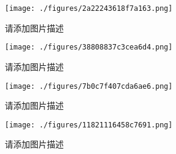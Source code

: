 
\begin{issues}
\issueDraft
\end{issues}

\begin{figure}[ht]
\centering
\texttt{[image: ./figures/2a22243618f7a163.png]}
\caption{请添加图片描述} \label{fig_PhText_1}
\end{figure}

\begin{figure}[ht]
\centering
\texttt{[image: ./figures/38808837c3cea6d4.png]}
\caption{请添加图片描述} \label{fig_PhText_2}
\end{figure}

\begin{figure}[ht]
\centering
\texttt{[image: ./figures/7b0c7f407cda6ae6.png]}
\caption{请添加图片描述} \label{fig_PhText_3}
\end{figure}

\begin{figure}[ht]
\centering
\texttt{[image: ./figures/11821116458c7691.png]}
\caption{请添加图片描述} \label{fig_PhText_4}
\end{figure}